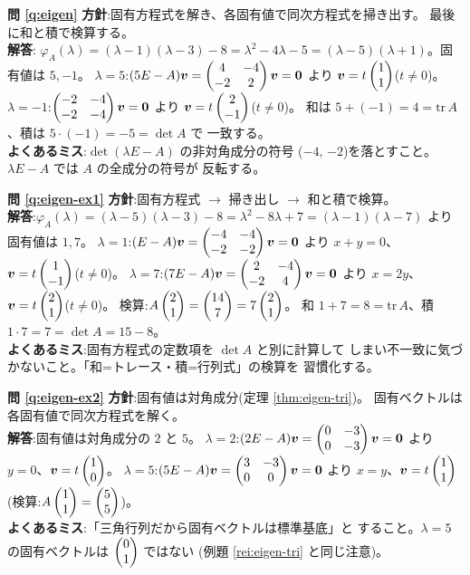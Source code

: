 \noindent\textbf{問 \ref{q:eigen}}\quad
\textbf{方針}:固有方程式を解き、各固有値で同次方程式を掃き出す。
最後に和と積で検算する。\\
\textbf{解答}:
$\varphi_A(\lambda) = (\lambda - 1)(\lambda - 3) - 8 = \lambda^2 - 4\lambda - 5
= (\lambda - 5)(\lambda + 1)$。固有値は $5, -1$。
$\lambda = 5$:$(5E - A)\bm{v} = \begin{pmatrix}4 & -4 \\ -2 & 2\end{pmatrix}\bm{v} = \bm{0}$
より $\bm{v} = t\begin{pmatrix}1 \\ 1\end{pmatrix}$($t \neq 0$)。
$\lambda = -1$:$\begin{pmatrix}-2 & -4 \\ -2 & -4\end{pmatrix}\bm{v} = \bm{0}$ より
$\bm{v} = t\begin{pmatrix}2 \\ -1\end{pmatrix}$($t \neq 0$)。
和は $5 + (-1) = 4 = \mathrm{tr}\,A$、積は $5 \cdot (-1) = -5 = \det A$ で
一致する。\\
\textbf{よくあるミス}:$\det(\lambda E - A)$ の非対角成分の符号
($-4$, $-2$)を落とすこと。$\lambda E - A$ では $A$ の全成分の符号が
反転する。

\bigskip
\noindent\textbf{問 \ref{q:eigen-ex1}}\quad
\textbf{方針}:固有方程式 $\to$ 掃き出し $\to$ 和と積で検算。\\
\textbf{解答}:$\varphi_A(\lambda) = (\lambda - 5)(\lambda - 3) - 8
= \lambda^2 - 8\lambda + 7 = (\lambda - 1)(\lambda - 7)$ より
固有値は $1, 7$。
$\lambda = 1$:$(E - A)\bm{v} = \begin{pmatrix}-4 & -4 \\ -2 & -2\end{pmatrix}\bm{v} = \bm{0}$
より $x + y = 0$、$\bm{v} = t\begin{pmatrix}1 \\ -1\end{pmatrix}$($t \neq 0$)。
$\lambda = 7$:$(7E - A)\bm{v} = \begin{pmatrix}2 & -4 \\ -2 & 4\end{pmatrix}\bm{v} = \bm{0}$
より $x = 2y$、$\bm{v} = t\begin{pmatrix}2 \\ 1\end{pmatrix}$($t \neq 0$)。
検算:$A\begin{pmatrix}2 \\ 1\end{pmatrix} = \begin{pmatrix}14 \\ 7\end{pmatrix} = 7\begin{pmatrix}2 \\ 1\end{pmatrix}$。
和 $1 + 7 = 8 = \mathrm{tr}\,A$、積 $1 \cdot 7 = 7 = \det A = 15 - 8$。\\
\textbf{よくあるミス}:固有方程式の定数項を $\det A$ と別に計算して
しまい不一致に気づかないこと。「和=トレース・積=行列式」の検算を
習慣化する。

\bigskip
\noindent\textbf{問 \ref{q:eigen-ex2}}\quad
\textbf{方針}:固有値は対角成分(定理 \ref{thm:eigen-tri})。
固有ベクトルは各固有値で同次方程式を解く。\\
\textbf{解答}:固有値は対角成分の $2$ と $5$。
$\lambda = 2$:$(2E - A)\bm{v} = \begin{pmatrix}0 & -3 \\ 0 & -3\end{pmatrix}\bm{v} = \bm{0}$
より $y = 0$、$\bm{v} = t\begin{pmatrix}1 \\ 0\end{pmatrix}$。
$\lambda = 5$:$(5E - A)\bm{v} = \begin{pmatrix}3 & -3 \\ 0 & 0\end{pmatrix}\bm{v} = \bm{0}$
より $x = y$、$\bm{v} = t\begin{pmatrix}1 \\ 1\end{pmatrix}$
(検算:$A\begin{pmatrix}1 \\ 1\end{pmatrix} = \begin{pmatrix}5 \\ 5\end{pmatrix}$)。\\
\textbf{よくあるミス}:「三角行列だから固有ベクトルは標準基底」と
すること。$\lambda = 5$ の固有ベクトルは $\begin{pmatrix}0 \\ 1\end{pmatrix}$ ではない
(例題 \ref{rei:eigen-tri} と同じ注意)。

